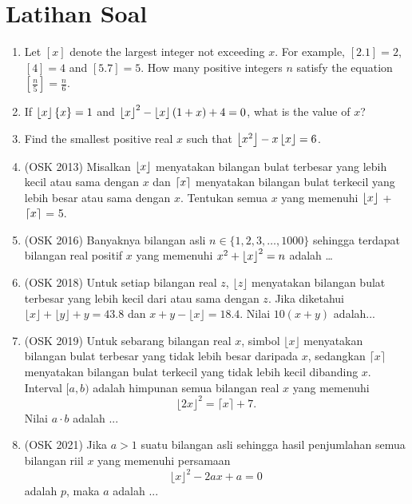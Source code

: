 \documentclass[12pt]{scrartcl}
\begin{document}
\section{Latihan Soal}
\begin{enumerate}
    \item Let $[x]$ denote the largest integer not exceeding $x$. For example, $[2.1]=2$, $[4]=4$ and $[5.7]=5$. How many positive integers $n$ satisfy the equation $\left[\frac{n}{5}\right]=\frac{n}{6}$.

    \item If $\left\lfloor x \right\rfloor\{x\} = 1$ and $\left\lfloor x \right\rfloor^2-\left\lfloor x \right\rfloor(1+x)+4=0$, what is the value of $x$?

    \item Find the smallest positive real $x$ such that $\left\lfloor x^2 \right\rfloor-x\left\lfloor x \right\rfloor=6$. 
    
    \item (OSK 2013) Misalkan $\left\lfloor x \right\rfloor$ menyatakan bilangan bulat terbesar yang lebih kecil atau sama dengan $x$ dan $\left\lceil x \right\rceil$ menyatakan bilangan bulat terkecil yang lebih besar atau sama dengan $x$. Tentukan semua $x$ yang memenuhi $\left\lfloor x \right\rfloor$ + $\left\lceil x \right\rceil$ = 5.
    
    \item (OSK 2016) Banyaknya bilangan asli $n \in \{1,2,3,\dots,1000\}$ sehingga terdapat bilangan real positif $x$ yang memenuhi $x^2+\left\lfloor x \right\rfloor^2=n$ adalah \dots
    
    \item (OSK 2018) Untuk setiap bilangan real $z$, $\lfloor z \rfloor$ menyatakan bilangan bulat terbesar yang lebih kecil dari atau sama dengan $z$. Jika diketahui $\lfloor x \rfloor + \lfloor y \rfloor + y = 43.8$ dan $x + y - \lfloor x \rfloor = 18.4$. Nilai $10(x + y)$ adalah...

    \item (OSK 2019) Untuk sebarang bilangan real $x$, simbol $\lfloor x \rfloor$ menyatakan bilangan bulat terbesar yang tidak lebih besar daripada $x$, sedangkan $\lceil x \rceil$ menyatakan bilangan bulat terkecil yang tidak lebih kecil dibanding $x$. Interval $[a, b)$ adalah himpunan semua bilangan real $x$ yang memenuhi
    $$\lfloor 2x \rfloor^2 = \lceil x \rceil + 7.$$
    Nilai $a \cdot b$ adalah ...

    \item (OSK 2021) Jika $a > 1$ suatu bilangan asli sehingga hasil penjumlahan semua bilangan riil $x$ yang memenuhi persamaan
    $$\lfloor x \rfloor^2 - 2ax + a = 0$$
    adalah $p$, maka $a$ adalah ...


\end{enumerate}
\end{document}
